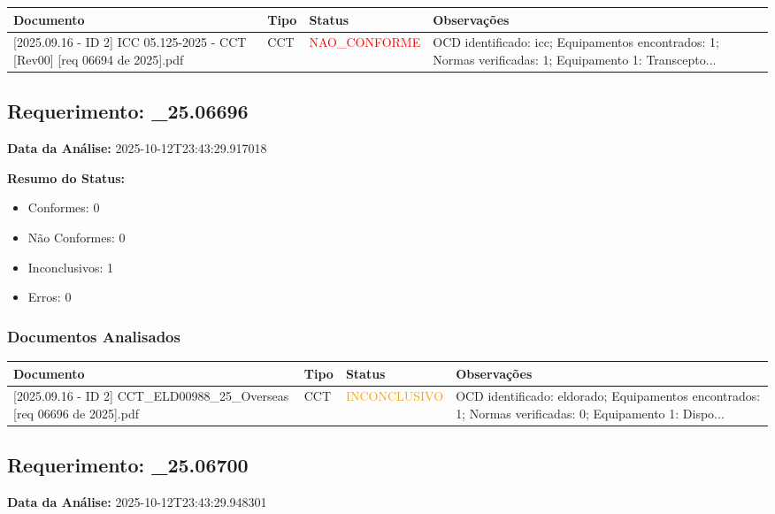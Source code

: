 \documentclass[12pt,a4paper]{article}
\begin{document}
\begin{longtable}{|p{4cm}|p{2cm}|p{2cm}|p{6cm}|}
\hline
\textbf{Documento} & \textbf{Tipo} & \textbf{Status} & \textbf{Observações} \\
\hline
\endhead
[Certificado de Conformidade Técnica - CCT][2025.09.16 - ID 2] ICC 05.125-2025 - CCT [Rev00] [req 06694 de  2025].pdf & CCT & \textcolor{red}{NAO\_CONFORME} & OCD identificado: icc; Equipamentos encontrados: 1; Normas verificadas: 1; Equipamento 1: Transcepto... \\
\hline
\end{longtable}


\subsection{Requerimento: \_25.06696}

\textbf{Data da Análise:} 2025-10-12T23:43:29.917018

\textbf{Resumo do Status:}
\begin{itemize}
    \item Conformes: 0
    \item Não Conformes: 0
    \item Inconclusivos: 1
    \item Erros: 0
\end{itemize}

\subsubsection{Documentos Analisados}

\begin{longtable}{|p{4cm}|p{2cm}|p{2cm}|p{6cm}|}
\hline
\textbf{Documento} & \textbf{Tipo} & \textbf{Status} & \textbf{Observações} \\
\hline
\endhead
[Certificado de Conformidade Técnica - CCT][2025.09.16 - ID 2] CCT\_ELD00988\_25\_Overseas [req 06696 de  2025].pdf & CCT & \textcolor{orange}{INCONCLUSIVO} & OCD identificado: eldorado; Equipamentos encontrados: 1; Normas verificadas: 0; Equipamento 1: Dispo... \\
\hline
\end{longtable}


\subsection{Requerimento: \_25.06700}

\textbf{Data da Análise:} 2025-10-12T23:43:29.948301
\end{document}
